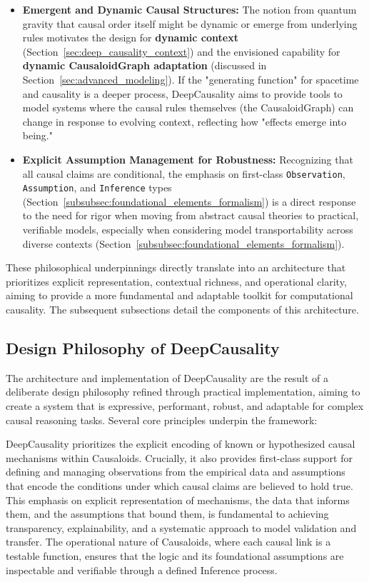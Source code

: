 \begin{itemize}
    \item \textbf{Emergent and Dynamic Causal Structures:} The notion from quantum gravity that causal order itself might be dynamic or emerge from underlying rules motivates the design for \textbf{dynamic context} (Section~\ref{sec:deep_causality_context}) and the envisioned capability for \textbf{dynamic CausaloidGraph adaptation} (discussed in Section~\ref{sec:advanced_modeling}). If the "generating function" for spacetime and causality is a deeper process, DeepCausality aims to provide tools to model systems where the causal rules themselves (the CausaloidGraph) can change in response to evolving context, reflecting how "effects emerge into being."

    \item \textbf{Explicit Assumption Management for Robustness:} Recognizing that all causal claims are conditional, the emphasis on first-class \texttt{Observation}, \texttt{Assumption}, and \texttt{Inference} types (Section~\ref{subsubsec:foundational_elements_formalism}) is a direct response to the need for rigor when moving from abstract causal theories to practical, verifiable models, especially when considering model transportability across diverse contexts (Section~\ref{subsubsec:foundational_elements_formalism}).
\end{itemize}

These philosophical underpinnings directly translate into an architecture that prioritizes explicit representation, contextual richness, and operational clarity, aiming to provide a more fundamental and adaptable toolkit for computational causality. The subsequent subsections detail the components of this architecture.


\subsection{Design Philosophy of DeepCausality}
\label{subsec:design_philosophy}

The architecture and implementation of DeepCausality are the result of a deliberate design philosophy refined through practical implementation, aiming to create a system that is expressive, performant, robust, and adaptable for complex causal reasoning tasks. Several core principles underpin the framework:

DeepCausality prioritizes the explicit encoding of known or hypothesized causal mechanisms within Causaloids. Crucially, it also provides first-class support for defining and managing observations from the empirical data and assumptions that encode the conditions under which causal claims are believed to hold true. This emphasis on explicit representation of mechanisms, the data that informs them, and the assumptions that bound them, is fundamental to achieving transparency, explainability, and a systematic approach to model validation and transfer. The operational nature of Causaloids, where each causal link is a testable function, ensures that the logic and its foundational assumptions are inspectable and verifiable through a defined Inference process.


